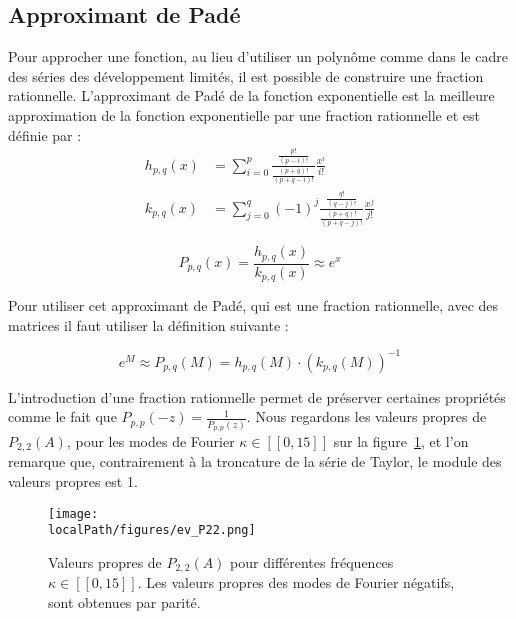 \subsection{Approximant de Padé}

Pour approcher une fonction, au lieu d'utiliser un polynôme comme dans le cadre des séries des développement limités, il est possible de construire une fraction rationnelle. L'approximant de Padé de la fonction exponentielle est la meilleure approximation de la fonction exponentielle par une fraction rationnelle et est définie par :
$$
  \begin{aligned}
    h_{p,q}(x) &= \sum_{i=0}^p \frac{\frac{p!}{(p-i)!}}{\frac{(p+q)!}{(p+q-i)!}}\frac{x^i}{i!} \\
    k_{p,q}(x) &= \sum_{j=0}^q (-1)^j \frac{\frac{q!}{(q-j)!}}{\frac{(p+q)!}{(p+q-j)!}} \frac{x^j}{j!}
  \end{aligned}
$$

$$
  P_{p,q}(x) = \frac{h_{p,q}(x)}{k_{p,q}(x)} \approx e^x
$$

Pour utiliser cet approximant de Padé, qui est une fraction rationnelle, avec des matrices il faut utiliser la définition suivante :

$$
  e^M \approx P_{p,q}(M) = h_{p,q}(M)\cdot\left(k_{p,q}(M)\right)^{-1}
$$

L'introduction d'une fraction rationnelle permet de préserver certaines propriétés comme le fait que $P_{p,p}(-z) = \frac{1}{P_{p,p}(z)}$. Nous regardons les valeurs propres de $P_{2,2}(A)$, pour les modes de Fourier $\kappa\in[\![0,15]\!]$ sur la figure~\ref{fig:ev:P22}, et l'on remarque que, contrairement à la troncature de la série de Taylor, le module des valeurs propres est 1.

\begin{figure}
  \centering
  \texttt{[image: \\localPath/figures/ev\_P22.png]}
  \caption{Valeurs propres de $P_{2,2}(A)$ pour différentes fréquences $\kappa\in[\![0,15]\!]$. Les valeurs propres des modes de Fourier négatifs, sont obtenues par parité.}
  \label{fig:ev:P22}
\end{figure}


